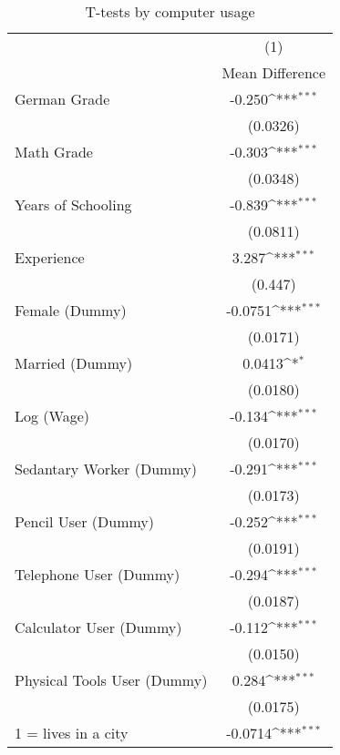 \begin{table}[htbp]\centering
\def\sym#1{\ifmmode^{#1}\else\(^{#1}\)\fi}
\caption{T-tests by computer usage\label{1c}}
\begin{tabular}{l*{1}{c}}
\hline\hline
                    &\multicolumn{1}{c}{(1)}\\
                    &\multicolumn{1}{c}{Mean Difference}\\
\hline
German Grade        &      -0.250\sym{***}\\
                    &    (0.0326)         \\
[1em]
Math Grade          &      -0.303\sym{***}\\
                    &    (0.0348)         \\
[1em]
Years of Schooling  &      -0.839\sym{***}\\
                    &    (0.0811)         \\
[1em]
Experience          &       3.287\sym{***}\\
                    &     (0.447)         \\
[1em]
Female (Dummy)      &     -0.0751\sym{***}\\
                    &    (0.0171)         \\
[1em]
Married (Dummy)     &      0.0413\sym{*}  \\
                    &    (0.0180)         \\
[1em]
Log (Wage)          &      -0.134\sym{***}\\
                    &    (0.0170)         \\
[1em]
Sedantary Worker (Dummy)&      -0.291\sym{***}\\
                    &    (0.0173)         \\
[1em]
Pencil User (Dummy) &      -0.252\sym{***}\\
                    &    (0.0191)         \\
[1em]
Telephone User (Dummy)&      -0.294\sym{***}\\
                    &    (0.0187)         \\
[1em]
Calculator User (Dummy)&      -0.112\sym{***}\\
                    &    (0.0150)         \\
[1em]
Physical Tools User (Dummy)&       0.284\sym{***}\\
                    &    (0.0175)         \\
[1em]
1 = lives in a city &     -0.0714\sym{***}\\

\end{tabular}
\end{table}
